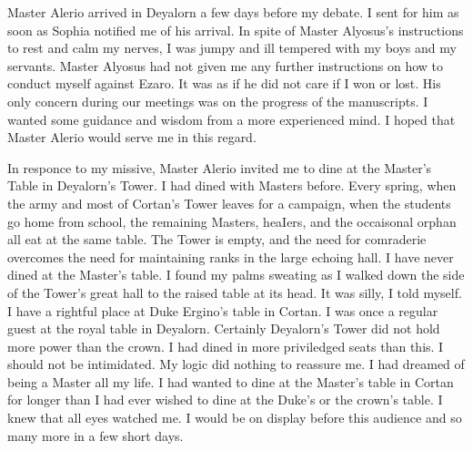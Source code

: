 \documentclass{article}
\begin{document}
\vspace{.5cm}

Master Alerio arrived in Deyalorn a few days before my debate. I sent for him as soon as Sophia notified me of his arrival. In spite of Master Alyosus's instructions to rest and calm my nerves, I was jumpy and ill tempered with my boys and my servants. Master Alyosus had not given me any further instructions on how to conduct myself against Ezaro. It was as if he did not care if I won or lost. His only concern during our meetings was on the progress of the manuscripts. I wanted some guidance and wisdom from a more experienced mind. I hoped that Master Alerio would serve me in this regard.

In responce to my missive, Master Alerio invited me to dine at the Master's Table in Deyalorn's Tower. I had dined with Masters before. Every spring, when the army and most of Cortan's Tower leaves for a campaign, when the students go home from school, the remaining Masters, heaIers, and the occaisonal orphan all eat at the same table. The Tower is empty, and the need for comraderie overcomes the need for maintaining ranks in the large echoing hall. I have never dined at the Master's table. I found my palms sweating as I walked down the side of the Tower's great hall to the raised table at its head. It was silly, I told myself. I have a rightful place at Duke Ergino's table in Cortan. I was once a regular guest at the royal table in Deyalorn. Certainly Deyalorn's Tower did not hold more power than the crown. I had dined in more priviledged seats than this. I should not be intimidated. My logic did nothing to reassure me. I had dreamed of being a Master all my life. I had wanted to dine at the Master's table in Cortan for longer than I had ever wished to dine at the Duke's or the crown's table. I knew that all eyes watched me. I would be on display before this audience and so many more in a few short days.
\end{document}
